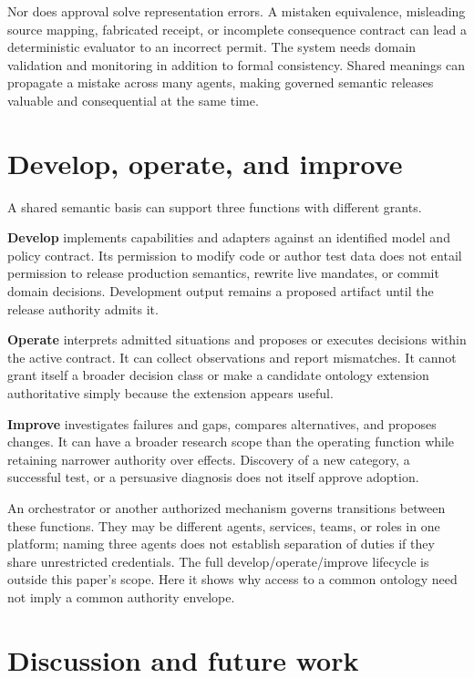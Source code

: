 \documentclass[
  english,
  12pt,
  a4paper,
  preprint,
  numbers,
  nopreprintline]{elsarticle}
\begin{document}
Nor does approval solve representation errors. A mistaken equivalence,
misleading source mapping, fabricated receipt, or incomplete consequence
contract can lead a deterministic evaluator to an incorrect permit. The
system needs domain validation and monitoring in addition to formal
consistency. Shared meanings can propagate a mistake across many agents,
making governed semantic releases valuable and consequential at the same
time.

\section{Develop, operate, and
improve}\label{develop-operate-and-improve}

A shared semantic basis can support three functions with different
grants.

\textbf{Develop} implements capabilities and adapters against an
identified model and policy contract. Its permission to modify code or
author test data does not entail permission to release production
semantics, rewrite live mandates, or commit domain decisions.
Development output remains a proposed artifact until the release
authority admits it.

\textbf{Operate} interprets admitted situations and proposes or executes
decisions within the active contract. It can collect observations and
report mismatches. It cannot grant itself a broader decision class or
make a candidate ontology extension authoritative simply because the
extension appears useful.

\textbf{Improve} investigates failures and gaps, compares alternatives,
and proposes changes. It can have a broader research scope than the
operating function while retaining narrower authority over effects.
Discovery of a new category, a successful test, or a persuasive
diagnosis does not itself approve adoption.

An orchestrator or another authorized mechanism governs transitions
between these functions. They may be different agents, services, teams,
or roles in one platform; naming three agents does not establish
separation of duties if they share unrestricted credentials. The full
develop/operate/improve lifecycle is outside this paper's scope. Here it
shows why access to a common ontology need not imply a common authority
envelope.

\section{Discussion and future work}\label{discussion-and-future-work}
\end{document}
